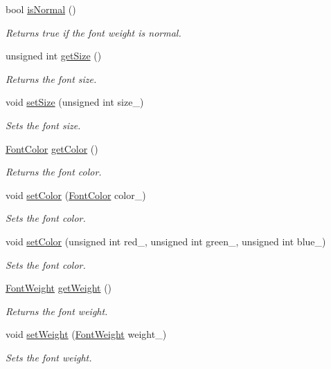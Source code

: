 \begin{CompactItemize}
bool \hyperlink{class_style_07721a2c2c852f4281368731d22d74b7}{isNormal} ()
\begin{CompactList}\small\item\em Returns true if the font weight is normal. \item\end{CompactList}\item 
unsigned int \hyperlink{class_style_7797f0204f6af51911d887f970d9fbeb}{getSize} ()
\begin{CompactList}\small\item\em Returns the font size. \item\end{CompactList}\item 
void \hyperlink{class_style_b5044902245b464966c13ed6daccb4f3}{setSize} (unsigned int size\_\-)
\begin{CompactList}\small\item\em Sets the font size. \item\end{CompactList}\item 
\hyperlink{struct_font_color}{FontColor} \hyperlink{class_style_0cc67191ece90fc438835a20f2047669}{getColor} ()
\begin{CompactList}\small\item\em Returns the font color. \item\end{CompactList}\item 
void \hyperlink{class_style_0f9befe0f1b7956339d7068ebc024b9c}{setColor} (\hyperlink{struct_font_color}{FontColor} color\_\-)
\begin{CompactList}\small\item\em Sets the font color. \item\end{CompactList}\item 
void \hyperlink{class_style_4f2df0b03c03b39036732a51716305a0}{setColor} (unsigned int red\_\-, unsigned int green\_\-, unsigned int blue\_\-)
\begin{CompactList}\small\item\em Sets the font color. \item\end{CompactList}\item 
\hyperlink{_font_weight_8h_ecff23ba4a68486421bcea57e095fe66}{FontWeight} \hyperlink{class_style_39e6b6db6483c8f8baee630230fa8386}{getWeight} ()
\begin{CompactList}\small\item\em Returns the font weight. \item\end{CompactList}\item 
void \hyperlink{class_style_75f1eaa59c2aff7c52df467c0d9157b1}{setWeight} (\hyperlink{_font_weight_8h_ecff23ba4a68486421bcea57e095fe66}{FontWeight} weight\_\-)
\begin{CompactList}\small\item\em Sets the font weight. \item\end{CompactList}\end{CompactItemize}
